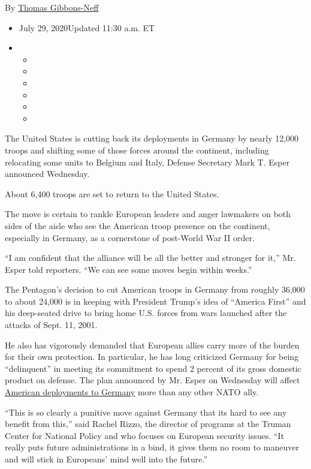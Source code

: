 By
\href{https://www.nytimes3xbfgragh.onion/by/thomas-gibbons-neff}{Thomas
Gibbons-Neff}

\begin{itemize}
\item
  July 29, 2020Updated 11:30 a.m. ET
\item
  \begin{itemize}
  \item
  \item
  \item
  \item
  \item
  \item
  \end{itemize}
\end{itemize}

The United States is cutting back its deployments in Germany by nearly
12,000 troops and shifting some of those forces around the continent,
including relocating some units to Belgium and Italy, Defense Secretary
Mark T. Esper announced Wednesday.

About 6,400 troops are set to return to the United States.

The move is certain to rankle European leaders and anger lawmakers on
both sides of the aisle who see the American troop presence on the
continent, especially in Germany, as a cornerstone of post-World War II
order.

``I am confident that the alliance will be all the better and stronger
for it,'' Mr. Esper told reporters. ``We can see some moves begin within
weeks.''

The Pentagon's decision to cut American troops in Germany from roughly
36,000 to about 24,000 is in keeping with President Trump's idea of
``America First'' and his deep-seated drive to bring home U.S. forces
from wars launched after the attacks of Sept. 11, 2001.

He also has vigorously demanded that European allies carry more of the
burden for their own protection. In particular, he has long criticized
Germany for being ``delinquent'' in meeting its commitment to spend 2
percent of its gross domestic product on defense. The plan announced by
Mr. Esper on Wednesday will affect
\href{https://www.nytimes3xbfgragh.onion/2020/06/06/world/europe/germany-troop-withdrawal-america.html}{American
deployments to Germany} more than any other NATO ally.

``This is so clearly a punitive move against Germany that its hard to
see any benefit from this,'' said Rachel Rizzo, the director of programs
at the Truman Center for National Policy and who focuses on European
security issues. ``It really puts future administrations in a bind, it
gives them no room to maneuver and will stick in Europeans' mind well
into the future.''

